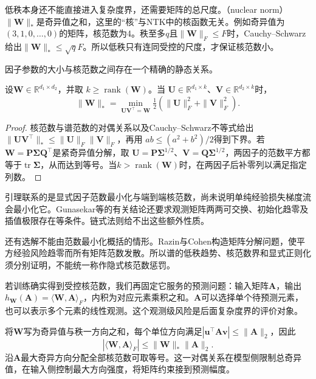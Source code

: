 低秩本身还不能直接进入复杂度界，还需要矩阵的总尺度。（nuclear norm）$\|\bm W\|_*$是奇异值之和，这里的“核”与NTK中的核函数无关。例如奇异值为$(3,1,0,\ldots,0)$的矩阵，核范数为4。秩至多$q$且$\|\bm W\|_F\leq F$时，Cauchy--Schwarz给出$\|\bm W\|_*\leq\sqrt qF$。所以低秩只有连同受控的尺度，才保证核范数小。

因子参数的大小与核范数之间存在一个精确的静态关系。
\begin{lemma}[二层分解的范数关系]
\label{lem:factorization-nuclear-norm}
设$\bm W\in\mathbb R^{d_1\times d_2}$，并取
$k\geq\operatorname{rank}(\bm W)$。当
$\bm U\in\mathbb R^{d_1\times k}$、$\bm V\in\mathbb R^{d_2\times k}$时，
\[
 \|\bm W\|_*=\min_{\bm U\bm V^\top=\bm W}
       \tfrac12(\|\bm U\|_F^2+\|\bm V\|_F^2).
\]
\end{lemma}
\begin{proof}
核范数与谱范数的对偶关系以及Cauchy--Schwarz不等式给出
$\|\bm U\bm V^\top\|_*\leq\|\bm U\|_F\|\bm V\|_F$，再用
$ab\leq(a^2+b^2)/2$得到下界。若$\bm W=\bm P\bm\Sigma\bm Q^\top$是紧奇异值分解，取
$\bm U=\bm P\bm\Sigma^{1/2}$、$\bm V=\bm Q\bm\Sigma^{1/2}$，两因子的范数平方都等于$\operatorname{tr}\bm\Sigma$，从而达到等号。当$k>\operatorname{rank}(\bm W)$时，在两因子后补零列以满足指定列数。
\end{proof}

引理联系的是显式因子范数最小化与端到端核范数，尚未说明单纯经验损失梯度流会最小化它。Gunasekar等的有关结论还要求观测矩阵两两可交换、初始化趋零及插值极限存在等条件。链式法则给不出这些额外性质。

还有选解不能由范数最小化概括的情形。Razin与Cohen构造矩阵分解问题，使平方经验风险趋零而所有矩阵范数发散。所以谱的低秩趋势、核范数界和显式正则化须分别证明，不能统一称作隐式核范数惩罚。

若训练确实得到受控核范数，我们再固定它服务的预测问题：输入矩阵$\bm A$，输出$h_{\bm W}(\bm A)=\langle\bm W,\bm A\rangle_F$，内积为对应元素乘积之和。$\bm A$可以选择单个待预测元素，也可以表示多个元素的线性观测。这个观测级风险是后面复杂度界的评价对象。

将$\bm W$写为奇异值与秩一方向之和，每个单位方向满足$|\bm u^\top\bm A\bm v|\leq\|\bm A\|_2$，因此
\[
 |\langle\bm W,\bm A\rangle_F|\leq\|\bm W\|_*\|\bm A\|_2.
\]
沿$\bm A$最大奇异方向分配全部核范数可取等号。这一对偶关系在模型侧限制总奇异值，在输入侧控制最大方向强度，将矩阵约束接到预测幅度。

